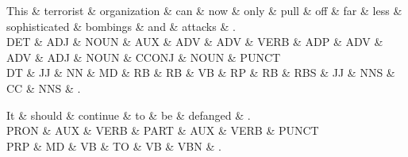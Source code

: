 \begin{dependency}
\begin{deptext}
This \& terrorist \& organization \& can \& now \& only \& pull \& off \& far \& less \& sophisticated \& bombings \& and \& attacks \& . \\
DET \& ADJ \& NOUN \& AUX \& ADV \& ADV \& VERB \& ADP \& ADV \& ADV \& ADJ \& NOUN \& CCONJ \& NOUN \& PUNCT \\
DT \& JJ \& NN \& MD \& RB \& RB \& VB \& RP \& RB \& RBS \& JJ \& NNS \& CC \& NNS \& . \\
\end{deptext}



\end{dependency}

\begin{dependency}
\begin{deptext}
It \& should \& continue \& to \& be \& defanged \& . \\
PRON \& AUX \& VERB \& PART \& AUX \& VERB \& PUNCT \\
PRP \& MD \& VB \& TO \& VB \& VBN \& . \\
\end{deptext}



\end{dependency}

